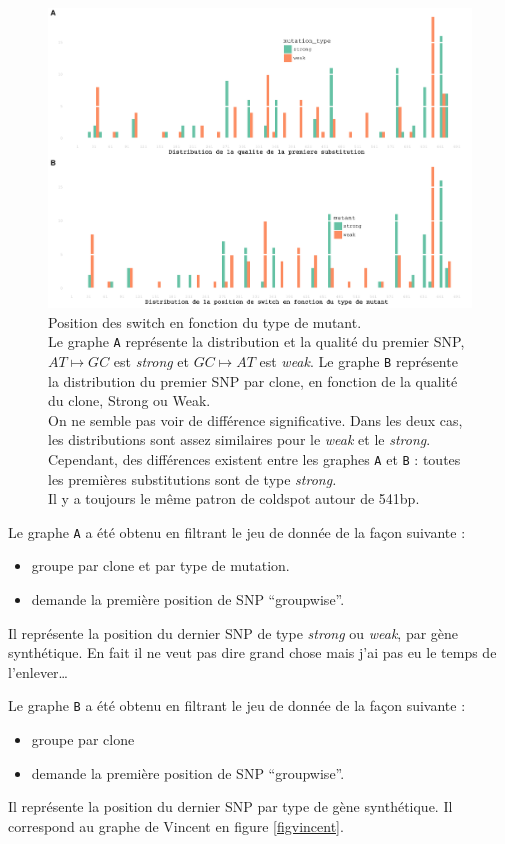 \documentclass[a4paper]{tufte-handout}
\begin{document}
\begin{figure}
  \includegraphics[width=\linewidth]{../switch_pos_by_mutant.pdf}
  \caption{Position des switch en fonction du type de mutant. \\
    Le graphe \texttt{A} représente la distribution et la qualité du premier
    SNP, $AT \mapsto GC$ est \emph{strong} et $GC \mapsto AT$ est \emph{weak}.
    Le graphe \texttt{B} représente la distribution du premier SNP par clone, en
    fonction de la qualité du clone, Strong ou Weak. \\
    On ne semble pas voir de différence significative. Dans les deux cas, les
    distributions sont assez similaires pour le \emph{weak} et le \emph{strong}.
    Cependant, des différences existent entre les graphes \texttt{A} et
    \texttt{B} : toutes les premières substitutions sont de type
    \emph{strong.} \\
    Il y a toujours le même patron de coldspot autour de 541bp.}
\end{figure}

Le graphe \texttt{A} a été obtenu en filtrant le jeu de donnée de la façon suivante : 
\begin{itemize}
\item groupe par clone et par type de mutation.
\item demande la première position de SNP ``groupwise''.
\end{itemize}
Il représente la position du dernier SNP de type \emph{strong} ou \emph{weak}, par gène
synthétique. En fait il ne veut pas dire grand chose mais j'ai pas eu le temps
de l'enlever…

Le graphe \texttt{B} a été obtenu en filtrant le jeu de donnée de la façon suivante :
\begin{itemize}
\item groupe par clone
\item demande la première position de SNP ``groupwise''.
\end{itemize}
Il représente la position du dernier SNP par type de gène synthétique. Il
correspond au graphe de Vincent en figure \ref{figvincent}. 
\end{document}
